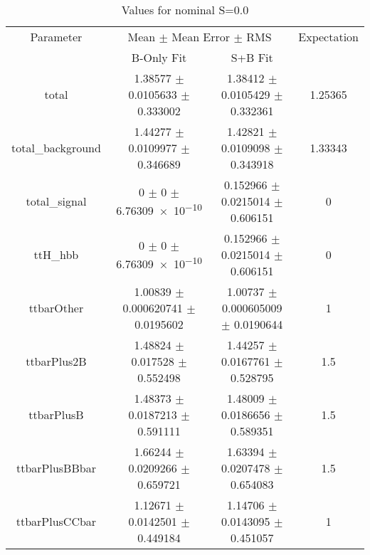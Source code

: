\begin{table}
\centering
\caption{Values for nominal S=0.0}
\begin{tabular}{cccc}
\toprule
Parameter & \multicolumn{2}{c}{Mean $\pm$ Mean Error $\pm$ RMS} & Expectation\\
 & B-Only Fit & S+B Fit & \\
\midrule
total & \num{1.38577} $\pm$ \num{0.0105633} $\pm$ \num{0.333002} & \num{1.38412} $\pm$ \num{0.0105429} $\pm$ \num{0.332361} & \num{1.25365}\\
total\_background & \num{1.44277} $\pm$ \num{0.0109977} $\pm$ \num{0.346689} & \num{1.42821} $\pm$ \num{0.0109098} $\pm$ \num{0.343918} & \num{1.33343}\\
total\_signal & \num{0} $\pm$ \num{0} $\pm$ \num{6.76309e-10} & \num{0.152966} $\pm$ \num{0.0215014} $\pm$ \num{0.606151} & \num{0}\\
ttH\_hbb & \num{0} $\pm$ \num{0} $\pm$ \num{6.76309e-10} & \num{0.152966} $\pm$ \num{0.0215014} $\pm$ \num{0.606151} & \num{0}\\
ttbarOther & \num{1.00839} $\pm$ \num{0.000620741} $\pm$ \num{0.0195602} & \num{1.00737} $\pm$ \num{0.000605009} $\pm$ \num{0.0190644} & \num{1}\\
ttbarPlus2B & \num{1.48824} $\pm$ \num{0.017528} $\pm$ \num{0.552498} & \num{1.44257} $\pm$ \num{0.0167761} $\pm$ \num{0.528795} & \num{1.5}\\
ttbarPlusB & \num{1.48373} $\pm$ \num{0.0187213} $\pm$ \num{0.591111} & \num{1.48009} $\pm$ \num{0.0186656} $\pm$ \num{0.589351} & \num{1.5}\\
ttbarPlusBBbar & \num{1.66244} $\pm$ \num{0.0209266} $\pm$ \num{0.659721} & \num{1.63394} $\pm$ \num{0.0207478} $\pm$ \num{0.654083} & \num{1.5}\\
ttbarPlusCCbar & \num{1.12671} $\pm$ \num{0.0142501} $\pm$ \num{0.449184} & \num{1.14706} $\pm$ \num{0.0143095} $\pm$ \num{0.451057} & \num{1}\\
\bottomrule
\end{tabular}
\end{table}